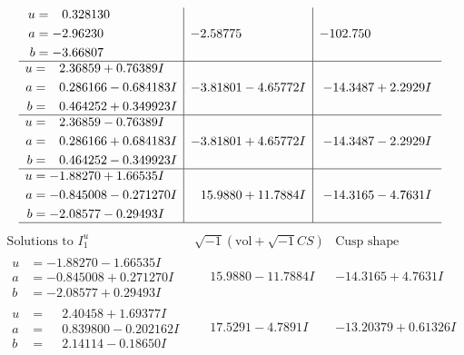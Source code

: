 \documentclass[1p]{elsarticle_modified}
\theoremstyle{definition}
\newcommand{\I}{\sqrt{-1}}
\begin{document}
$$\begin{array}{c|c|c}
\begin{aligned}
u &= \phantom{-}0.328130\phantom{ +0.000000I} \\
a &= -2.96230\phantom{ +0.000000I} \\
b &= -3.66807\phantom{ +0.000000I}\end{aligned}
 & -2.58775\phantom{ +0.000000I} & -102.750\phantom{ +0.000000I} \\ \hline\begin{aligned}
u &= \phantom{-}2.36859 + 0.76389 I \\
a &= \phantom{-}0.286166 - 0.684183 I \\
b &= \phantom{-}0.464252 + 0.349923 I\end{aligned}
 & -3.81801 - 4.65772 I & -14.3487 + 2.2929 I \\ \hline\begin{aligned}
u &= \phantom{-}2.36859 - 0.76389 I \\
a &= \phantom{-}0.286166 + 0.684183 I \\
b &= \phantom{-}0.464252 - 0.349923 I\end{aligned}
 & -3.81801 + 4.65772 I & -14.3487 - 2.2929 I \\ \hline\begin{aligned}
u &= -1.88270 + 1.66535 I \\
a &= -0.845008 - 0.271270 I \\
b &= -2.08577 - 0.29493 I\end{aligned}
 & \phantom{-}15.9880 + 11.7884 I & -14.3165 - 4.7631 I\\
 \hline 
 \end{array}$$\newpage$$\begin{array}{c|c|c}  
\text{Solutions to }I^u_{1}& \I (\text{vol} + \sqrt{-1}CS) & \text{Cusp shape}\\
 \hline 
\begin{aligned}
u &= -1.88270 - 1.66535 I \\
a &= -0.845008 + 0.271270 I \\
b &= -2.08577 + 0.29493 I\end{aligned}
 & \phantom{-}15.9880 - 11.7884 I & -14.3165 + 4.7631 I \\ \hline\begin{aligned}
u &= \phantom{-}2.40458 + 1.69377 I \\
a &= \phantom{-}0.839800 - 0.202162 I \\
b &= \phantom{-}2.14114 - 0.18650 I\end{aligned}
 & \phantom{-}17.5291 - 4.7891 I & -13.20379 + 0.61326 I \\ \hline\begin{aligned}

\end{aligned}
\end{array}$$
\end{document}
